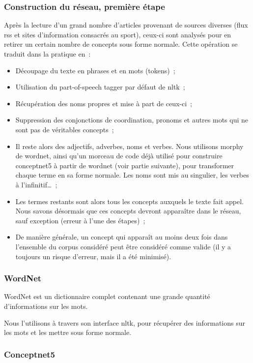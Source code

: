 \documentclass{article}           %
\begin{document}
\subsubsection{Construction du réseau, première étape}

Après la lecture d'un grand nombre d'articles provenant de sources diverses (flux rss et sites d'information consacrés au sport), ceux-ci sont analysés pour en retirer un certain nombre de concepts sous forme normale. Cette opération se traduit dans la pratique en~:
\begin{itemize}
 \item Découpage du texte en phrases et en mots (tokens)~;
 \item Utilisation du part-of-speech tagger par défaut de nltk~;
 \item Récupération des noms propres et mise à part de ceux-ci~;
 \item Suppression des conjonctions de coordination, pronoms et autres mots qui ne sont pas de véritables concepts~;
 \item Il reste alors des adjectifs, adverbes, noms et verbes. Nous utilisons morphy de wordnet, ainsi qu'un morceau de code déjà utilisé pour construire conceptnet5 à partir de wordnet (voir partie suivante), pour transformer chaque terme en sa forme normale. Les noms sont mis au singulier, les verbes à l'infinitif\ldots{}~;
 \item Les termes restants sont alors tous les concepts auxquels le texte fait appel. Nous savons désormais que ces concepts devront apparaître dans le réseau, sauf exception (erreur à l'une des étapes)~;
 \item De manière générale, un concept qui apparaît au moins deux fois dans l'ensemble du corpus considéré peut être considéré comme valide (il y a toujours un risque d'erreur, mais il a été minimisé).
\end{itemize}


\subsubsection{WordNet}

WordNet est un dictionnaire complet contenant une grande quantité d'informations sur les mots.

Nous l'utilisons à travers son interface nltk, pour récupérer des informations sur les mots et les mettre sous forme normale.


\subsubsection{Conceptnet5}
\end{document}
